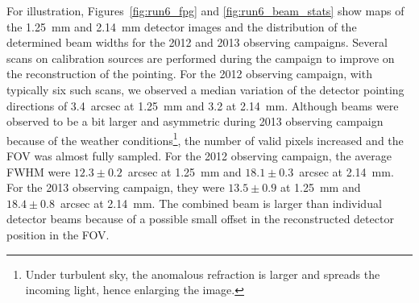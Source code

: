 For illustration, Figures~\ref{fig:run6_fpg} and \ref{fig:run6_beam_stats} show
maps of the 1.25~mm and 2.14~mm detector images and the distribution of the
determined beam widths for the 2012 and 2013 observing campaigns. Several scans on
calibration sources are performed during the campaign to improve on the
reconstruction of the pointing. For the 2012 observing campaign, with typically
six such scans, we observed a median variation of the detector pointing
directions of 3.4~arcsec at 1.25~mm and 3.2 at 2.14~mm.
Although beams were observed to be
a bit larger and asymmetric during 2013 observing campaign because of the weather conditions\footnote{Under turbulent sky, the anomalous refraction is larger and spreads the incoming light, hence enlarging the image.}, the number of valid pixels increased and the FOV was almost fully sampled. For the
2012 observing campaign, the average FWHM were $12.3\pm 0.2$~arcsec at 1.25~mm and $18.1 \pm 0.3$~arcsec
at 2.14~mm. For the 2013 observing campaign, they were $13.5\pm 0.9$ at 1.25~mm and
$18.4\pm0.8$~arcsec at 2.14~mm.
The combined beam is larger than individual detector beams because of a possible small offset in the reconstructed detector position in the FOV. 